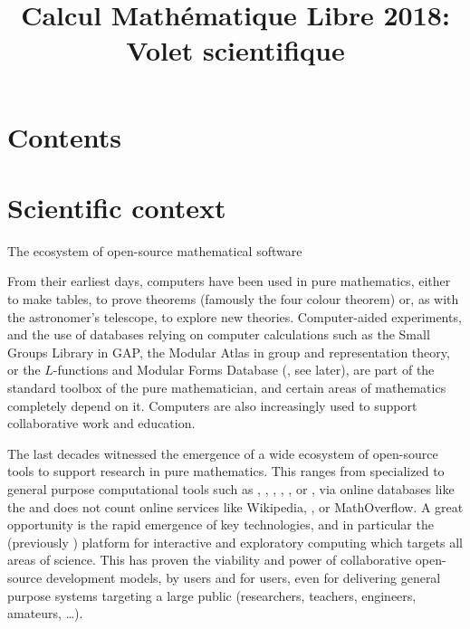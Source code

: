 \documentclass[12pt]{amsart}
\makeatletter
\def\subsection{\@startsection{subsection}{2}%
  \z@{.3\linespacing\@plus.5\linespacing}{.1\linespacing}%
  {\normalfont\bfseries}}
\makeatother
\begin{document}
\title{Calcul Mathématique Libre 2018:\\Volet scientifique}
\maketitle
\thispagestyle{empty}

\renewcommand{\contentsname}{}

\section*{Contents}
\tableofcontents

\section{Scientific context}

\subsection{The ecosystem of open-source mathematical software}

From their earliest days, computers have been used in pure
mathematics, either to make tables, to prove theorems (famously the
four colour theorem) or, as with the astronomer's telescope, to
explore new theories. Computer-aided experiments, and the use of
databases relying on computer calculations such as the Small Groups
Library in GAP, the Modular Atlas in group and representation theory,
or the $L$-functions and Modular Forms Database (\LMFDB, see later),
are part of the standard toolbox of the pure mathematician, and
certain areas of mathematics completely depend on it. Computers are
also increasingly used to support collaborative work and education.

The last decades witnessed the emergence of a wide ecosystem of
open-source tools to support research in pure mathematics. This ranges
from specialized to general purpose computational tools such as \GAP,
\PariGP, \Linbox, \MPIR, \Sage, or \Singular, via online databases
like the \LMFDB and does not count online services like Wikipedia,
\Arxiv, or MathOverflow. A great opportunity is the rapid emergence of
key technologies, and in particular the \Jupyter (previously \IPython)
platform for interactive and exploratory computing which targets all
areas of science. This has proven the viability and power of
collaborative open-source development models, by users and for users,
even for delivering general purpose systems targeting a large public
(researchers, teachers, engineers, amateurs, \ldots).
\end{document}

